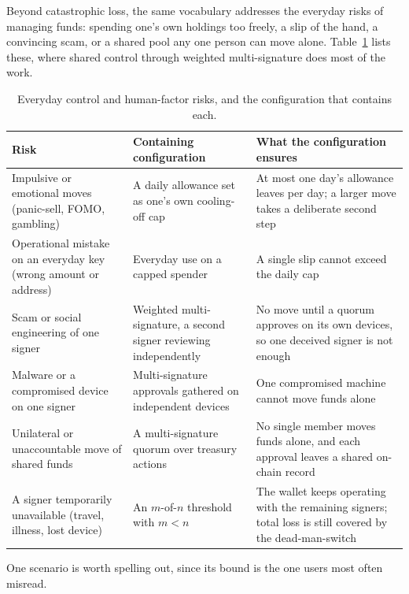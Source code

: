\documentclass[11pt,DIV=11,parskip=half-]{scrartcl}
\begin{document}
\noindent Beyond catastrophic loss, the same vocabulary addresses the everyday risks of managing funds: spending one's own holdings too freely, a slip of the hand, a convincing scam, or a shared pool any one person can move alone. Table~\ref{tab:control} lists these, where shared control through weighted multi-signature does most of the work.

\begin{table}[ht]
\centering\small
\renewcommand{\arraystretch}{1.3}
\begin{tabularx}{\linewidth}{@{}X X X@{}}
\toprule
\textbf{Risk} & \textbf{Containing configuration} & \textbf{What the configuration ensures} \\
\midrule
Impulsive or emotional moves (panic-sell, FOMO, gambling) & A daily allowance set as one's own cooling-off cap & At most one day's allowance leaves per day; a larger move takes a deliberate second step \\
Operational mistake on an everyday key (wrong amount or address) & Everyday use on a capped spender & A single slip cannot exceed the daily cap \\
Scam or social engineering of one signer & Weighted multi-signature, a second signer reviewing independently & No move until a quorum approves on its own devices, so one deceived signer is not enough \\
Malware or a compromised device on one signer & Multi-signature approvals gathered on independent devices & One compromised machine cannot move funds alone \\
Unilateral or unaccountable move of shared funds & A multi-signature quorum over treasury actions & No single member moves funds alone, and each approval leaves a shared on-chain record \\
A signer temporarily unavailable (travel, illness, lost device) & An $m$-of-$n$ threshold with $m<n$ & The wallet keeps operating with the remaining signers; total loss is still covered by the dead-man-switch \\
\bottomrule
\end{tabularx}
\caption{Everyday control and human-factor risks, and the configuration that contains each.}
\label{tab:control}
\end{table}

One scenario is worth spelling out, since its bound is the one users most often misread.
\end{document}
